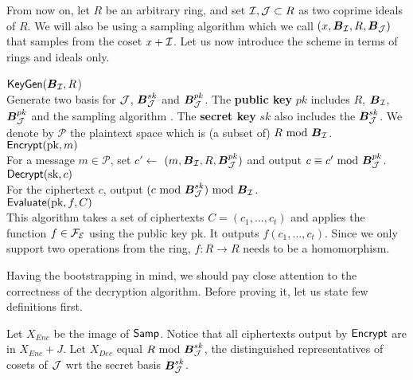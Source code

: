 From now on, let $R$ be an arbitrary ring, and set $\mathcal{I}, \mathcal{J} \subset R$ as two coprime ideals of $R$.  We will also be using a sampling algorithm which we call $(x, \boldsymbol{B}_{\mathcal{I}} , R, \boldsymbol{B}_{\mathcal{J}})$ that samples from the coset $x + \mathcal{I}$. Let us now introduce the scheme in terms of rings and ideals only.

\begin{mdframed}
	$\textsf{KeyGen}(\boldsymbol{B}_{\mathcal{I}}, R$) \\
	Generate two basis for $\mathcal{J}$, $\boldsymbol{B}_{\mathcal{J}}^{sk}$ and $\boldsymbol{B}_{\mathcal{J}}^{pk}$. The \textbf{public key} $pk$ includes $R$, $\boldsymbol{B}_{\mathcal{I}}$, $\boldsymbol{B}_{\mathcal{J}}^{pk}$ and the sampling algorithm . The \textbf{secret key} $sk$  also includes the $\boldsymbol{B}_{\mathcal{J}}^{sk}$. We denote by $\mathcal{P}$ the plaintext space which is (a subset of) $R \text{ mod } \boldsymbol{B}_{\mathcal{I}}$.\\
	$\textsf{Encrypt}(\text{pk}, m)$ \\
	For a message $m \in \mathcal{P}$, set $c' \leftarrow$ $(m, \boldsymbol{B}_{\mathcal{I}}, R, \boldsymbol{B}_{\mathcal{J}}^{pk})$ and output $c \equiv c' \text{ mod } \boldsymbol{B}_{\mathcal{J}}^{pk}$.\\
	$\textsf{Decrypt}(\text{sk}, c)$ \\
	For the ciphertext $c$, output $(c \text{ mod } \boldsymbol{B}_{\mathcal{J}}^{sk}) \text{ mod } \boldsymbol{B}_{\mathcal{I}}$.\\
	$\textsf{Evaluate}(\text{pk}, f, C)$ \\
	This algorithm takes a set of ciphertexts $C = (c_1, \ldots, c_t)$ and applies the function $f \in \mathcal{F}_{\mathcal{E}}$ using the public key pk. It outputs $f(c_1, \ldots, c_t)$. Since we only support two operations from the ring, $f: R \rightarrow R$ needs to be a homomorphism.
\end{mdframed}

Having the bootstrapping in mind, we should pay close attention to the correctness of the decryption algorithm. Before proving it, let us state few definitions first.

\begin{definition}
	Let $X_{Enc}$ be the image of $\textsf{Samp}$. Notice that all ciphertexts output by $\textsf{Encrypt}$ are in $X_{Enc} + J$. Let $X_{Dec}$ equal $R \text{ mod } \boldsymbol{B}^{sk}_{\mathcal{J}}$, the distinguished representatives of cosets of $\mathcal{J}$ wrt the secret basis $\boldsymbol{B}^{sk}_{\mathcal{J}}$.
\end{definition}

